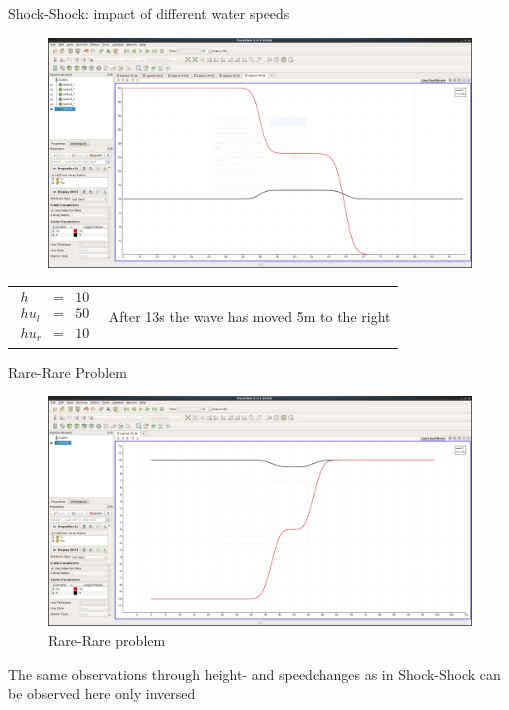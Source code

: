 \documentclass[shortpres]{beamer}
\newcommand{\imgvoffset}{-20pt}
\newcommand{\imgfullscale}{0.75}
\begin{document}
\begin{frame}{Shock-Shock: impact of different water speeds}
	\begin{figure}[t]
		\vspace{\imgvoffset}
		\includegraphics[width=\imgfullscale\linewidth]{img/Shock_hul50_t13.png}
		\caption*{}
	\end{figure}
	
	\begin{tabular}{m{3cm} m{\linewidth-5cm}}
		$
		\begin{matrix}
		h & = & 10\\
		hu_l & = & 50\\
		hu_r & = & 10
		\end{matrix}
		$
		&
		
		After 13s the wave has moved 5m to the right 
	\end{tabular}
\end{frame}


\begin{frame}{Rare-Rare Problem}
	\begin{figure}[t]
		\vspace{\imgvoffset}
		\includegraphics[clip, width=\imgfullscale\linewidth]{img/Rare-Rare.png}
		\caption*{Rare-Rare problem}
	\end{figure}
	The same observations through height- and speedchanges as in Shock-Shock can be observed here only inversed
\end{frame}
\end{document}
